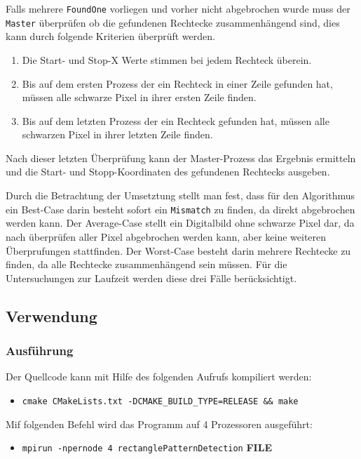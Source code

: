 Falls mehrere \texttt{FoundOne} vorliegen und vorher nicht abgebrochen wurde muss der \texttt{Master} überprüfen ob die gefundenen Rechtecke zusammenhängend sind, dies kann durch folgende Kriterien überprüft werden.

\begin{enumerate}
	\item Die Start- und Stop-X Werte stimmen bei jedem Rechteck überein.
	\item Bis auf dem ersten Prozess der ein Rechteck in einer Zeile gefunden hat, müssen alle schwarze Pixel in ihrer ersten Zeile finden.
	\item Bis auf dem letzten Prozess der ein Rechteck gefunden hat, müssen alle schwarzen Pixel in ihrer letzten Zeile finden.
\end{enumerate}

Nach dieser letzten Überprüfung kann der Master-Prozess das Ergebnis ermitteln und die Start- und Stopp-Koordinaten des gefundenen Rechtecks ausgeben. 

Durch die Betrachtung der Umsetztung stellt man fest, dass für den Algorithmus ein Best-Case darin besteht sofort ein \texttt{Mismatch} zu finden, da direkt abgebrochen werden kann. Der Average-Case stellt ein Digitalbild ohne schwarze Pixel dar, da nach überprüfen aller Pixel abgebrochen werden kann, aber keine weiteren Überprufungen stattfinden. Der Worst-Case besteht darin mehrere Rechtecke zu finden, da alle Rechtecke zusammenhängend sein müssen. Für die Untersuchungen zur Laufzeit werden diese drei Fälle berücksichtigt.

\subsection{Verwendung}
\subsubsection{Ausführung}
Der Quellcode kann mit Hilfe des folgenden Aufrufs kompiliert werden:

\begin{itemize}
	\item \texttt{cmake CMakeLists.txt -DCMAKE\_BUILD\_TYPE=RELEASE \&\& make}
\end{itemize}

Mif folgenden Befehl wird das Programm auf 4 Prozessoren ausgeführt:

\begin{itemize}
	\item \texttt{mpirun -npernode 4 rectanglePatternDetection} \textbf{FILE}
\end{itemize}

